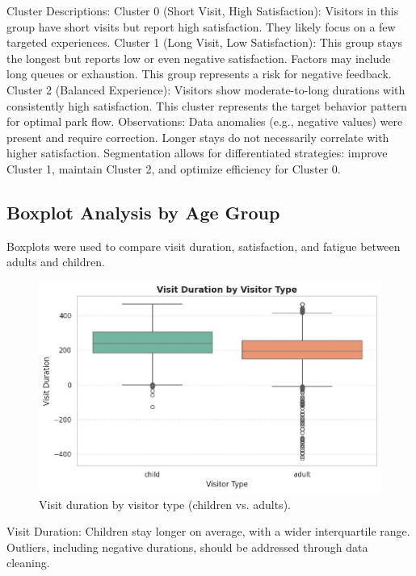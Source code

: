 \documentclass[12pt]{article}
\begin{document}
Cluster Descriptions:
Cluster 0 (Short Visit, High Satisfaction):
Visitors in this group have short visits but report high satisfaction. They likely focus on a few targeted experiences.
Cluster 1 (Long Visit, Low Satisfaction):
This group stays the longest but reports low or even negative satisfaction. Factors may include long queues or exhaustion. This group represents a risk for negative feedback.
Cluster 2 (Balanced Experience):
Visitors show moderate-to-long durations with consistently high satisfaction. This cluster represents the target behavior pattern for optimal park flow.
Observations:
Data anomalies (e.g., negative values) were present and require correction.
Longer stays do not necessarily correlate with higher satisfaction.
Segmentation allows for differentiated strategies: improve Cluster 1, maintain Cluster 2, and optimize efficiency for Cluster 0.


\subsection{Boxplot Analysis by Age Group}
Boxplots were used to compare visit duration, satisfaction, and fatigue between adults and children.

\begin{figure}[H]
    \centering
    \includegraphics[width=1\textwidth]{visit_duration_by_type.png}
    \caption{Visit duration by visitor type (children vs. adults).}
    \label{fig:visit-duration-type}
\end{figure}

Visit Duration:
Children stay longer on average, with a wider interquartile range. Outliers, including negative durations, should be addressed through data cleaning.
\end{document}
